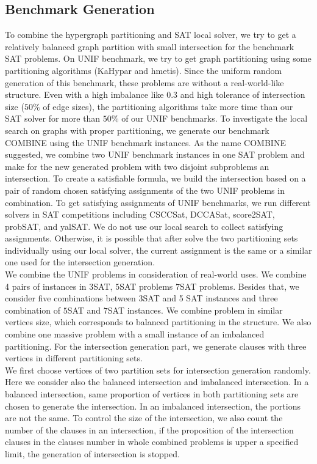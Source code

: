 \documentclass[12pt,a4paper,twoside]{scrartcl}
\numberwithin{equation}{section}
\begin{document}
\subsection{Benchmark Generation}
To combine the hypergraph partitioning and SAT local solver, we try to get a relatively balanced graph partition with small intersection for the benchmark SAT problems.  On UNIF benchmark, we try to get graph partitioning using some partitioning algorithms (KaHypar and hmetis). Since the uniform random generation of this benchmark, these problems are without a real-world-like structure. Even with a high imbalance like 0.3 and high tolerance of intersection size ($50\%$ of edge sizes), the partitioning algorithms take more time than our SAT solver for more than $50\%$ of our UNIF benchmarks.  To investigate the local search on graphs with proper partitioning, we generate our benchmark COMBINE  using the UNIF benchmark instances.  As the name COMBINE suggested, we combine two UNIF benchmark instances in one SAT problem and make for the new generated problem with two disjoint subproblems an intersection.  To create a satisfiable formula, we build the intersection based on a pair of random chosen satisfying assignments of the two UNIF problems in combination. To get satisfying assignments of UNIF benchmarks, we run different solvers in SAT competitions including CSCCSat, DCCASat, score2SAT, probSAT, and yalSAT. We do not use our local search to collect satisfying assignments. Otherwise, it is possible that after solve the two partitioning sets individually using our local solver, the current assignment is the same or a similar one used for the intersection generation.\\
We combine the UNIF problems in consideration of real-world uses. 
We combine 4  pairs of instances in  $3$SAT, $5$SAT problems $7$SAT problems. Besides that, we consider five combinations between  3SAT and 5 SAT instances and three combination of $5$SAT and $7$SAT instances. 
We combine problem in similar vertices size, which corresponds to balanced partitioning in the structure. We also combine one massive problem with a small instance of an imbalanced partitioning. For the intersection generation part, we generate clauses with three vertices in different partitioning sets. \\
We first choose vertices of two partition sets for intersection generation randomly. Here we consider also the balanced intersection and imbalanced intersection. In a balanced intersection, same proportion of vertices in both partitioning sets are chosen to generate the intersection. In an imbalanced intersection, the portions are not the same.  To control the size of the intersection, we also count the number of the clauses in an intersection, if the proposition of the intersection clauses in the clauses number in whole combined problems is upper a specified limit, the generation of intersection is stopped.
\end{document}
